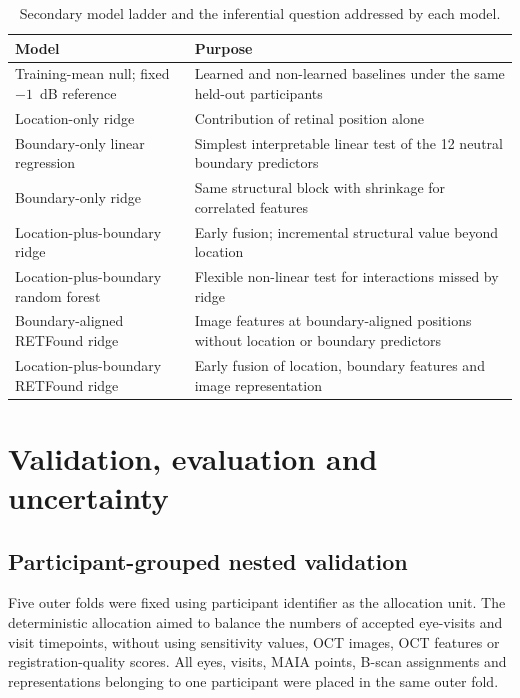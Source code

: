 \begin{table}[htbp]
\centering
\caption{Secondary model ladder and the inferential question addressed by each model.}
\label{tab:secondary-ladder}
\begin{tabularx}{\textwidth}{p{}X}
\toprule
Model & Purpose \\
\midrule
Training-mean null; fixed $-1$~dB reference & Learned and non-learned baselines under the same held-out participants \\
Location-only ridge & Contribution of retinal position alone \\
Boundary-only linear regression & Simplest interpretable linear test of the 12 neutral boundary predictors \\
Boundary-only ridge & Same structural block with shrinkage for correlated features \\
Location-plus-boundary ridge & Early fusion; incremental structural value beyond location \\
Location-plus-boundary random forest & Flexible non-linear test for interactions missed by ridge \\
Boundary-aligned RETFound ridge & Image features at boundary-aligned positions without location or boundary predictors \\
Location-plus-boundary RETFound ridge & Early fusion of location, boundary features and image representation \\
\bottomrule
\end{tabularx}
\end{table}

\section{Validation, evaluation and uncertainty}
\label{sec:validation}

\subsection{Participant-grouped nested validation}

Five outer folds were fixed using participant identifier as the allocation unit. The deterministic allocation aimed to balance the numbers of accepted eye-visits and visit timepoints, without using sensitivity values, OCT images, OCT features or registration-quality scores. All eyes, visits, MAIA points, B-scan assignments and representations belonging to one participant were placed in the same outer fold.


